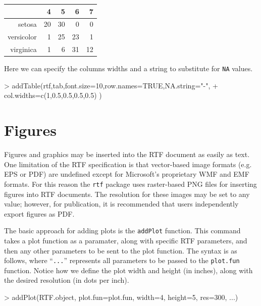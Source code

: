 \documentclass[11pt,letterpaper]{article}
\begin{document}
\begin{table}[!htbp]
\centering
\begin{tabular}{rrrrr}
  \hline
 & 4 & 5 & 6 & 7 \\ 
  \hline
setosa &  20 &  30 &   0 &   0 \\ 
  versicolor &   1 &  25 &  23 &   1 \\ 
  virginica &   1 &   6 &  31 &  12 \\ 
   \hline
\end{tabular}
\end{table}
Here we can specify the columns widths and a string to substitute for \texttt{NA} values.
\begin{Schunk}
\begin{Sinput}
> addTable(rtf,tab,font.size=10,row.names=TRUE,NA.string="-",
+              col.widths=c(1,0.5,0.5,0.5,0.5) )
\end{Sinput}
\end{Schunk}


\section{Figures}
Figures and graphics may be inserted into the RTF document as easily as text.  One limitation of the RTF specification is that vector-based image formats (e.g. EPS or PDF) are undefined except for Microsoft's proprietary WMF and EMF formats.  For this reason the \texttt{rtf} package uses raster-based PNG files for inserting figures into RTF documents.  The resolution for these images may be set to any value; however, for publication, it is recommended that users independently export figures as PDF.


The basic approach for adding plots is the \texttt{addPlot} function.  This command takes a plot function as a paramater, along with specific RTF parameters, and then any other parameters to be sent to the plot function.  The syntax is as follows, where ``\texttt{...}'' represents all parameters to be passed to the \texttt{plot.fun} function.  Notice how we define the plot width and height (in inches), along with the desired resolution (in dots per inch).

\begin{Schunk}
\begin{Sinput}
> addPlot(RTF.object, plot.fun=plot.fun, width=4, height=5, res=300, ...)
\end{Sinput}
\end{Schunk}
\end{document}
